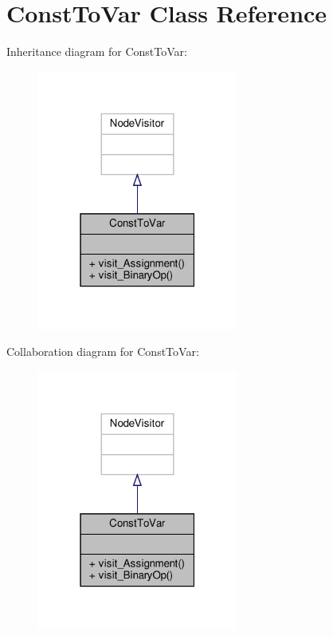 \hypertarget{classVisitors_1_1ConstToVar}{}\section{Const\+To\+Var Class Reference}
\label{classVisitors_1_1ConstToVar}


Inheritance diagram for Const\+To\+Var\+:\nopagebreak
\begin{figure}[H]
\begin{center}
\leavevmode
\includegraphics[width=187pt]{classVisitors_1_1ConstToVar__inherit__graph}
\end{center}
\end{figure}


Collaboration diagram for Const\+To\+Var\+:\nopagebreak
\begin{figure}[H]
\begin{center}
\leavevmode
\includegraphics[width=187pt]{classVisitors_1_1ConstToVar__coll__graph}
\end{center}
\end{figure}

